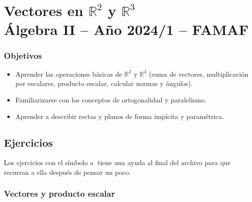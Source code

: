 \chapter{Vectores en $\mathbb R^2$ y $\mathbb R^3$\\Álgebra  II -- Año 2024/1 -- FAMAF}\label{practico-1}
    


\subsection*{Objetivos}

\begin{itemize}
 \item Aprender las operaciones básicas de $\mathbb R^2$ y $\mathbb R^3$ (suma de vectores, multiplicación por escalares, producto escalar, calcular normas y ángulos).
 \item Familiarizarse con los conceptos de ortogonalidad y paralelismo.
 \item Aprender a describir rectas y planos de forma impícita y paramétrica.
\end{itemize}


\section*{Ejercicios}

Los ejercicios con el símbolo \textcircled{a} tiene una ayuda al final del archivo para que recurran a ella después de pensar un poco.


\subsection*{Vectores y producto escalar}

